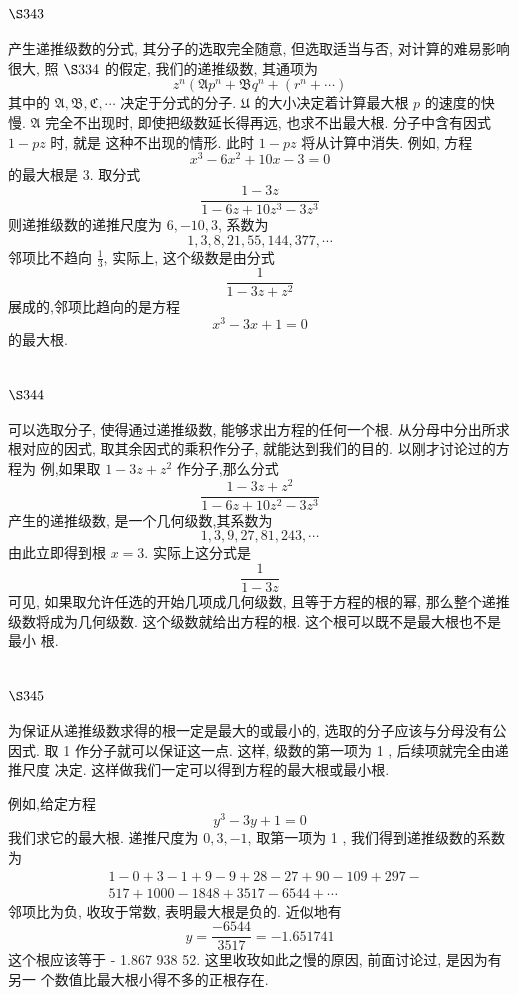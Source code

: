 \section{$\S 343$}

产生递推级数的分式, 其分子的选取完全随意, 但选取适当与否, 对计算的难易影响 很大, 照 $\S 334$ 的假定, 我们的递推级数, 其通项为
\[
z^{n}\left(\mathfrak{A} p^{n}+\mathfrak{B} q^{n}+\left(r^{n}+\cdots\right)\right.
\]
其中的 $\mathfrak{A}, \mathfrak{B}, \mathfrak{C}, \cdots$ 决定于分式的分子. $\mathfrak{U}$ 的大小决定着计算最大根 $p$ 的速度的快慢. $\mathfrak{A}$ 完全不出现时, 即使把级数延长得再远, 也求不出最大根. 分子中含有因式 $1-p z$ 时, 就是 这种不出现的情形. 此时 $1-p z$ 将从计算中消失. 例如, 方程
\[
x^{3}-6 x^{2}+10 x-3=0
\]
的最大根是 3. 取分式
\[
\frac{1-3 z}{1-6 z+10 z^{3}-3 z^{3}}
\]
则递推级数的递推尺度为 $6,-10,3$, 系数为
\[
1,3,8,21,55,144,377, \cdots
\]
邻项比不趋向 $\frac{1}{3}$, 实际上, 这个级数是由分式
\[
\frac{1}{1-3 z+z^{2}}
\]
展成的,邻项比趋向的是方程
\[
x^{3}-3 x+1=0
\]
的最大根.


\section{$\S 344$}

可以选取分子, 使得通过递推级数, 能够求出方程的任何一个根. 从分母中分出所求 根对应的因式, 取其余因式的乘积作分子, 就能达到我们的目的. 以刚才讨论过的方程为 例,如果取 $1-3 z+z^{2}$ 作分子,那么分式
\[
\frac{1-3 z+z^{2}}{1-6 z+10 z^{2}-3 z^{3}}
\]
产生的递推级数, 是一个几何级数,其系数为
\[
1,3,9,27,81,243, \cdots
\]
由此立即得到根 $x=3$. 实际上这分式是
\[
\frac{1}{1-3 z}
\]
可见, 如果取允许任选的开始几项成几何级数, 且等于方程的根的幂, 那么整个递推 级数将成为几何级数. 这个级数就给出方程的根. 这个根可以既不是最大根也不是最小 根.

\section{$\S 345$}

为保证从递推级数求得的根一定是最大的或最小的, 选取的分子应该与分母没有公 因式. 取 1 作分子就可以保证这一点. 这样, 级数的第一项为 1 , 后续项就完全由递推尺度 决定. 这样做我们一定可以得到方程的最大根或最小根.

例如,给定方程
\[
y^{3}-3 y+1=0
\]
我们求它的最大根. 递推尺度为 $0,3,-1$, 取第一项为 1 , 我们得到递推级数的系数为
\[
\begin{aligned}
& 1-0+3-1+9-9+28-27+90-109+297- \\
& 517+1000-1848+3517-6544+\cdots
\end{aligned}
\]
邻项比为负, 收玫于常数, 表明最大根是负的. 近似地有
\[
y=\frac{-6544}{3517}=-1.651741
\]
这个根应该等于 - 1.867 938 52. 这里收玫如此之慢的原因, 前面讨论过, 是因为有另一 个数值比最大根小得不多的正根存在.

